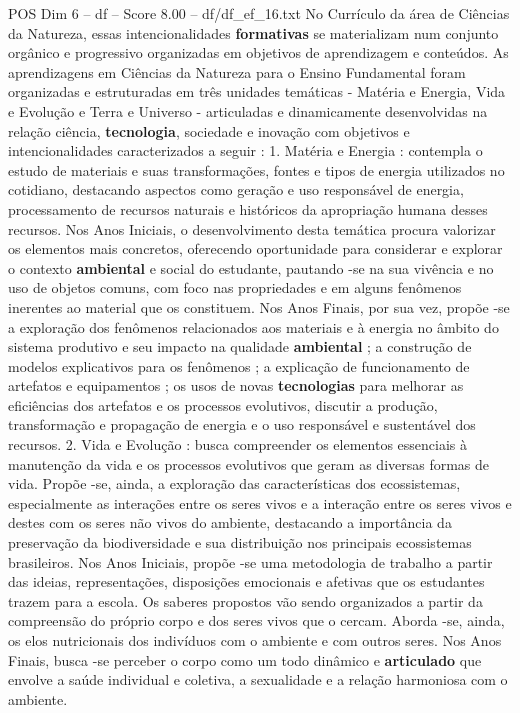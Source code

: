 \begin{textsample}{POS Dim 6 – df – Score 8.00 – df/df\_ef\_16.txt}
No Currículo da área de Ciências da Natureza, essas intencionalidades \textbf{formativas} se materializam num conjunto orgânico e progressivo organizadas em objetivos de aprendizagem e conteúdos.
As aprendizagens em Ciências da Natureza para o Ensino Fundamental foram organizadas e estruturadas em três unidades temáticas - Matéria e Energia, Vida e Evolução e Terra e Universo - articuladas e dinamicamente desenvolvidas na relação ciência, \textbf{tecnologia}, sociedade e inovação com objetivos e intencionalidades caracterizados a seguir : 1.
Matéria e Energia : contempla o estudo de materiais e suas transformações, fontes e tipos de energia utilizados no cotidiano, destacando aspectos como geração e uso responsável de energia, processamento de recursos naturais e históricos da apropriação humana desses recursos.
Nos Anos Iniciais, o desenvolvimento desta temática procura valorizar os elementos mais concretos, oferecendo oportunidade para considerar e explorar o contexto \textbf{ambiental} e social do estudante, pautando -se na sua vivência e no uso de objetos comuns, com foco nas propriedades e em alguns fenômenos inerentes ao material que os constituem.
Nos Anos Finais, por sua vez, propõe -se a exploração dos fenômenos relacionados aos materiais e à energia no âmbito do sistema produtivo e seu impacto na qualidade \textbf{ambiental} ; a construção de modelos explicativos para os fenômenos ; a explicação de funcionamento de artefatos e equipamentos ; os usos de novas \textbf{tecnologias} para melhorar as eficiências dos artefatos e os processos evolutivos, discutir a produção, transformação e propagação de energia e o uso responsável e sustentável dos recursos. 2.
Vida e Evolução : busca compreender os elementos essenciais à manutenção da vida e os processos evolutivos que geram as diversas formas de vida.
Propõe -se, ainda, a exploração das características dos ecossistemas, especialmente as interações entre os seres vivos e a interação entre os seres vivos e destes com os seres não vivos do ambiente, destacando a importância da preservação da biodiversidade e sua distribuição nos principais ecossistemas brasileiros.
Nos Anos Iniciais, propõe -se uma metodologia de trabalho a partir das ideias, representações, disposições emocionais e afetivas que os estudantes trazem para a escola.
Os saberes propostos vão sendo organizados a partir da compreensão do próprio corpo e dos seres vivos que o cercam.
Aborda -se, ainda, os elos nutricionais dos indivíduos com o ambiente e com outros seres.
Nos Anos Finais, busca -se perceber o corpo como um todo dinâmico e \textbf{articulado} que envolve a saúde individual e coletiva, a sexualidade e a relação harmoniosa com o ambiente.

\end{textsample}
